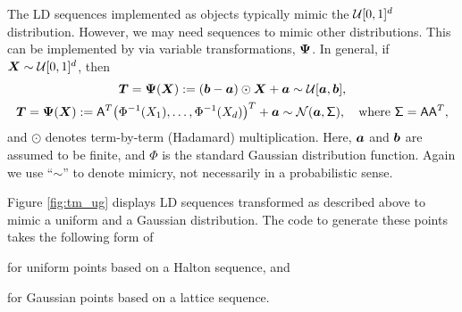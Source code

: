 \documentclass[graybox,footinfo]{svmult}
\newcommand{\mA}{\mathsf{A}}
\newcommand{\mSigma}{\mathsf{\Sigma}}
\begin{document}
The LD sequences implemented as  objects typically mimic the ${\mathcal{U}}[0,1]^d$ distribution.  However, we may need sequences to mimic other distributions.  This can be implemented by via variable transformations, ${\boldsymbol{\Psi}}$.  In general, if ${\boldsymbol{X}} \sim {\mathcal{U}}[0,1]^d$, then
\begin{subequations} \label{eq:exampleVarTrans}
\begin{gather}
\bsT = \bsPsi(\bsX) := (\bsb - \bsa) \odot \bsX + \bsa \sim  \calU[\bsa,\bsb], \\
\label{eq:exampleVarTransGauss}
\bsT = \bsPsi(\bsX) := \mA^T\bigl(\Phi^{-1}(X_1),  \ldots, \Phi^{-1}(X_d)\bigr)^T + \bsa \sim \calN(\bsa, \mSigma), \quad \text{where }  \mSigma = \mA \mA^T,
\end{gather}
\end{subequations}
and $\odot$ denotes term-by-term (Hadamard) multiplication.  Here, ${\boldsymbol{a}}$ and ${\boldsymbol{b}}$ are assumed to be finite, and $\Phi$ is the standard Gaussian distribution function.  Again we use ``$\sim$'' to denote mimicry, not necessarily in a probabilistic sense.

Figure \ref{fig:tm_ug} displays LD sequences transformed as described above to mimic a uniform and a Gaussian distribution.  The code to generate these points takes the following form of 

for uniform points based on a Halton sequence, and 

for Gaussian points based on a lattice sequence.
\end{document}
